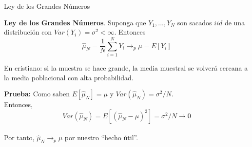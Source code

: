 \documentclass[11pt,handout,aspectratio=169]{beamer}
\newenvironment{wideitemize}{\itemize\addtolength{\itemsep}{10pt}}{\enditemize}
\begin{document}
\begin{frame}{Ley de los Grandes Números}
	
\begin{wideitemize}
	
\item \textbf{Ley de los Grandes Números}. Suponga que $Y_1,...,Y_N$ son sacados $iid$ de una distribución con $Var(Y_i) = \sigma^2 < \infty$. Entonces $$\hat\mu_N = \frac{1}{N} \sum_{i=1}^{N} Y_i \rightarrow_p \mu = E[Y_i]$$

\item
En cristiano: si la muestra se hace grande, la media muestral se volverá cercana a la media poblacional con alta probabilidad.

\pause
\item
\textbf{Prueba:} Como saben $E[\hat\mu_N] = \mu$ y $Var(\hat\mu_N) = \sigma^2 / N$.  \\

Entonces, $$Var(\hat\mu_N) = E[ (\hat\mu_N - \mu )^2 ] = \sigma^2/N \rightarrow 0 $$ \\

Por tanto, $\hat\mu_N \rightarrow_p \mu$ por nuestro ``hecho útil''. 
\end{wideitemize}	
	
\end{frame}
\end{document}

